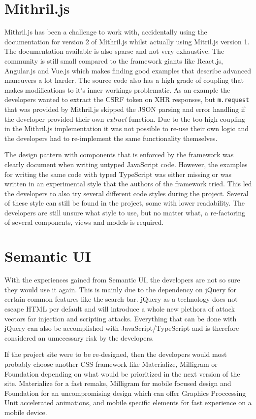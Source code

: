\documentclass[12pt,a4paper]{report}
\begin{document}
\section{Mithril.js}
Mithril.js has been a challenge to work with, accidentally using the documentation for version 2 of Mithril.js whilst actually using Mitril.js version 1. The documentation available is also sparse and not very exhaustive. The community is still small compared to the framework giants like React.js, Angular.js and Vue.js which makes finding good examples that describe advanced maneuvers a lot harder. The source code also has a high grade of coupling that makes modifications to it's inner workings problematic. As an example the developers wanted to extract the CSRF token on XHR responses, but \texttt{m.request} that was provided by Mithril.js skipped the JSON parsing and error handling if the developer provided their own \textit{extract} function. Due to the too high coupling in the Mithril.js implementation it was not possible to re-use their own logic and the developers had to re-implement the same functionality themselves.

The design pattern with components that is enforced by the framework was clearly document when writing untyped JavaScript code. However, the examples for writing the same code with typed TypeScript was either missing or was written in an experimental style that the authors of the framework tried. This led the developers to also try several different code styles during the project. Several of these style can still be found in the project, some with lower readability. The developers are still unsure what style to use, but no matter what, a re-factoring of several components, views and models is required.

\section{Semantic UI}
With the experiences gained from Semantic UI, the developers are not so sure they would use it again. This is mainly due to the dependency on jQuery for certain common features like the search bar. jQuery as a technology does not escape HTML per default\cite{jquery-sucks} and will introduce a whole new plethora of attack vectors for injection and scripting attacks. Everything that can be done with jQuery can also be accomplished with JavaScript/TypeScript and is therefore considered an unnecessary risk by the developers.

If the project site were to be re-designed, then the developers would most probably choose another CSS framework like Materialize, Milligram or Foundation depending on what would be prioritized in the next version of the site. Materialize\cite{materialize} for a fast remake, Milligram\cite{milligram} for mobile focused design and Foundation\cite{foundation} for an uncompromising design which can offer Graphics Proccessing Unit accelerated animations, and mobile specific elements for fast experience on a mobile device.
\end{document}
